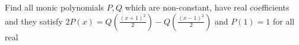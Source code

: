 Find all monic polynomials $P,Q$ which are non-constant, have real coefficients and they satisfy $2P(x)=Q(\frac{(x+1)^2}{2})-Q(\frac{(x-1)^2}{2})$ and $P(1)=1$ for all real 